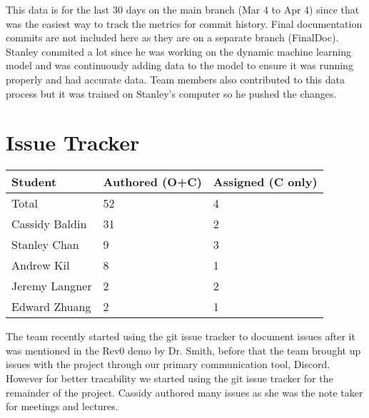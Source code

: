 \documentclass{article}
\begin{document}
This data is for the last 30 days on the main branch (Mar 4 to Apr 4) since that was the easiest way to track the metrics for commit history. Final documentation commits are not included here as they are on a separate branch (FinalDoc). Stanley commited a lot since he was working on the dynamic machine learning model and was continuously adding data to the model to ensure it was running properly and had accurate data. Team members also contributed to this data process but it was trained on Stanley's computer so he pushed the changes. 

\section{Issue Tracker}


\begin{table}[H]
\centering
\begin{tabular}{lll}
\toprule
\textbf{Student} & \textbf{Authored (O+C)} & \textbf{Assigned (C only)}\\
\midrule
Total & 52 & 4\\
Cassidy Baldin & 31 & 2\\
Stanley Chan & 9 & 3\\
Andrew Kil & 8 & 1\\
Jeremy Langner & 2 & 2\\
Edward Zhuang & 2 & 1\\
\bottomrule
\end{tabular}
\end{table}

The team recently started using the git issue tracker to document issues after it was mentioned in the Rev0 demo by Dr. Smith, before that the team brought up issues with the project through our primary communication tool, Discord. However for better tracability we started using the git issue tracker for the remainder of the project. Cassidy authored many issues as she was the note taker for meetings and lectures. 
\end{document}
